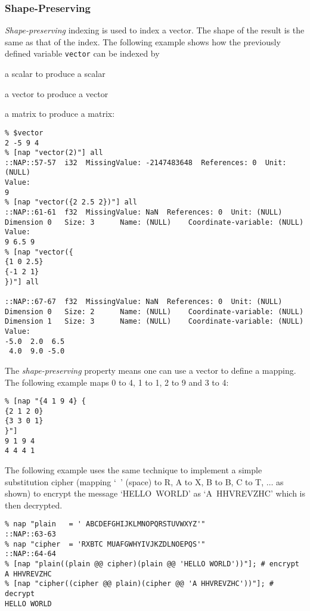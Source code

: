 \subsubsection{Shape-Preserving}
    \label{indexing-Shape-Preserving}

  \emph{Shape-preserving} indexing is used to index a vector. The
  shape of the result is the same as that of the index. The following
  example shows how the previously defined variable 
  \texttt{vector} can be indexed by
\begin{bullets}
    \item a scalar to produce a scalar
    \item a vector to produce a vector
    \item a matrix to produce a matrix:
\end{bullets}
  \begin{verbatim}
% $vector
2 -5 9 4
% [nap "vector(2)"] all
::NAP::57-57  i32  MissingValue: -2147483648  References: 0  Unit: (NULL)
Value:
9
% [nap "vector({2 2.5 2})"] all
::NAP::61-61  f32  MissingValue: NaN  References: 0  Unit: (NULL)
Dimension 0   Size: 3      Name: (NULL)    Coordinate-variable: (NULL)
Value:
9 6.5 9
% [nap "vector({
{1 0 2.5}
{-1 2 1}
})"] all

::NAP::67-67  f32  MissingValue: NaN  References: 0  Unit: (NULL)
Dimension 0   Size: 2      Name: (NULL)    Coordinate-variable: (NULL)
Dimension 1   Size: 3      Name: (NULL)    Coordinate-variable: (NULL)
Value:
-5.0  2.0  6.5
 4.0  9.0 -5.0
\end{verbatim}

The 
  \emph{shape-preserving} property means one can use a vector to
  define a mapping. The following example maps 0 to 4, 1 to 1, 2 to 9
  and 3 to 4:
  \begin{verbatim}
% [nap "{4 1 9 4} {
{2 1 2 0}
{3 3 0 1}
}"]
9 1 9 4
4 4 4 1
\end{verbatim}

The following example uses the same technique to implement a
simple substitution cipher (mapping `~' (space)
to R, A to X, B to B, C to T,
$\ldots$ as shown) to encrypt the message `HELLO~WORLD'
as `A~HHVREVZHC' which is then decrypted.
  \begin{verbatim}
% nap "plain   = ' ABCDEFGHIJKLMNOPQRSTUVWXYZ'"
::NAP::63-63
% nap "cipher  = 'RXBTC MUAFGWHYIVJKZDLNOEPQS'"
::NAP::64-64
% [nap "plain((plain @@ cipher)(plain @@ 'HELLO WORLD'))"]; # encrypt
A HHVREVZHC
% [nap "cipher((cipher @@ plain)(cipher @@ 'A HHVREVZHC'))"]; # decrypt
HELLO WORLD
\end{verbatim}

